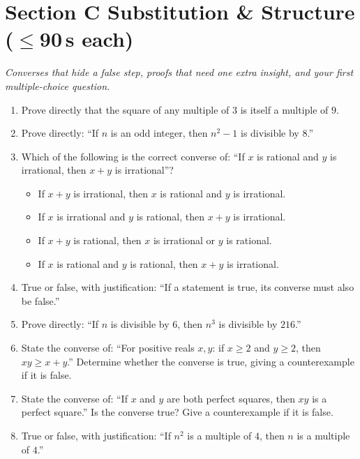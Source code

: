 \documentclass[11pt,a4paper]{article}
\begin{document}
\section*{Section C \quad Substitution \& Structure \hfill{\normalfont\small($\leq$90\,s each)}}

\noindent\textit{Converses that hide a false step, proofs that need one extra insight, and your first multiple-choice question.}

\begin{enumerate}

\item Prove directly that the square of any multiple of $3$ is itself a multiple of $9$.

\item Prove directly: ``If $n$ is an odd integer, then $n^2 - 1$ is divisible by $8$.''

\item Which of the following is the correct converse of: ``If $x$ is rational and $y$ is irrational, then $x+y$ is irrational''?
\begin{itemize}
\item[A)] If $x+y$ is irrational, then $x$ is rational and $y$ is irrational.
\item[B)] If $x$ is irrational and $y$ is rational, then $x+y$ is irrational.
\item[C)] If $x+y$ is rational, then $x$ is irrational or $y$ is rational.
\item[D)] If $x$ is rational and $y$ is rational, then $x+y$ is irrational.
\end{itemize}

\item True or false, with justification: ``If a statement is true, its converse must also be false.''

\item Prove directly: ``If $n$ is divisible by $6$, then $n^3$ is divisible by $216$.''

\item State the converse of: ``For positive reals $x,y$: if $x \geq 2$ and $y \geq 2$, then $xy \geq x+y$.'' Determine whether the converse is true, giving a counterexample if it is false.

\item State the converse of: ``If $x$ and $y$ are both perfect squares, then $xy$ is a perfect square.'' Is the converse true? Give a counterexample if it is false.

\item True or false, with justification: ``If $n^2$ is a multiple of $4$, then $n$ is a multiple of $4$.''

\end{enumerate}
\end{document}
